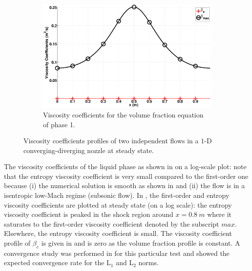 \documentclass[preprint,10pt]{elsarticle}
\begin{document}
\begin{figure}[H]
        \begin{subfigure}[b]{0.495\textwidth}
                \centering
                \includegraphics[width=\textwidth]{figures/nozzle-indep-phase_liquid_beta.eps}
                \caption{Viscosity coefficients for the volume fraction equation of phase 1.}
                \label{fig:nozzle-indep-beta}
        \end{subfigure}        
        \caption{Viscosity coefficients profiles of two independent flows in a $1$-D converging-diverging nozzle at steady state.}\label{fig:nozzle-indep-visc-coeff}
\end{figure}
%
The viscosity coefficients of the liquid phase as shown in  on a log-scale plot: note that the entropy viscosity coefficient is very small compared to the first-order one because 
(i) the numerical solution is smooth as shown in  and (ii) the flow is in a isentropic low-Mach regime (subsonic flow). 
In , 
the first-order and entropy viscosity coefficients are plotted at steady state (on a log scale): the entropy viscosity 
coefficient is peaked in the shock region around $x=0.8 \ m$ where it saturates to the first-order viscosity 
coefficient denoted by the subscript $max$. Elsewhere, the entropy  viscosity coefficient is small. The viscosity coefficient profile of $\beta_e$ is given in  and is zero as the volume fraction profile is constant. A convergence study was performed in \cite{Marco_paper_low_mach} for this particular test and showed the expected convergence rate for the L$_1$ and L$_2$ norms.
%
\end{document}
